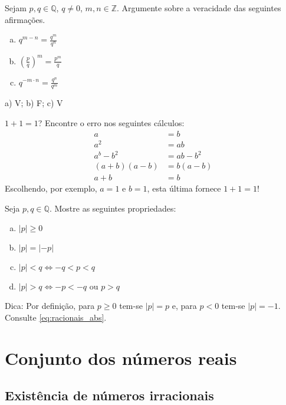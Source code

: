 \begin{exer}
  Sejam $p,q\in\mathbb{Q}$, $q\neq 0$, $m,n\in\mathbb{Z}$. Argumente sobre a veracidade das seguintes afirmações.
  \begin{enumerate}[a)]
  \item $q^{m-n} = \frac{q^m}{q^n}$
  \item $\displaystyle \left(\frac{p}{q}\right)^m = \frac{p^m}{q}$
  \item $q^{-m\cdot n} = \frac{q^n}{q^m}$
  \end{enumerate}
\end{exer}
\begin{resp}
  a) V; b) F; c) V
\end{resp}

\begin{exer}
  $1+1 = 1$? Encontre o erro nos seguintes cálculos:
  \begin{align}
    a &= b\\
    a^2 &= ab\\
    a^b - b^2 &= ab - b^2\\
    (a+b)(a-b) &= b(a-b)\\
    a+b &= b
  \end{align}
  Escolhendo, por exemplo, $a=1$ e $b=1$, esta última fornece $1+1 = 1$!
\end{exer}

\begin{exer}
  Seja $p,q\in\mathbb{Q}$. Mostre as seguintes propriedades:
  \begin{enumerate}[a)]
  \item $|p|\geq 0$
  \item $|p| = |-p|$
  \item $|p|<q\Leftrightarrow -q<p<q$
  \item $|p|>q\Leftrightarrow -p<-q\text{ ou }p>q$
  \end{enumerate}
\end{exer}
\begin{resp}
  Dica: Por definição, para $p\geq 0$ tem-se $|p|=p$ e, para $p<0$ tem-se $|p|=-1$. Consulte \eqref{eq:racionais_abs}.
\end{resp}

\section{Conjunto dos números reais}\label{cap_numreal_sec_numreal}

\subsection{Existência de números irracionais}

